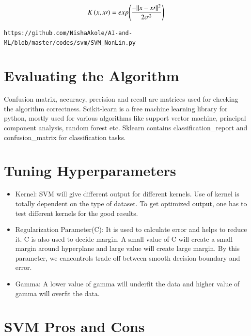 \documentclass[journal,12pt,twocolumn]{IEEEtran}
\def\SP#1{\textsuperscript{\textcolor{black}{#1}}}
\begin{document}
\begin{align}
K\brak{x,x\prime} = exp{\brak{\frac{-\norm{x-x\prime}\SP{2}}{2\sigma\SP{2}}}}
\end{align}

\begin{lstlisting}[mathescape=true]
https://github.com/NishaAkole/AI-and-ML/blob/master/codes/svm/SVM_NonLin.py
\end{lstlisting}

\section{Evaluating the Algorithm}
Confusion matrix, accuracy, precision and recall are matrices used for checking the algorithm correctness. Scikit-learn is a free machine learning library for python, mostly used for various algorithms like support vector machine, principal component analysis, random forest etc. Sklearn contains classification\_report and confusion\_matrix for classification tasks.

\section{Tuning Hyperparameters}
\begin{itemize}
\item Kernel: SVM will give different output for different kernels. Use of kernel is totally dependent on the type of dataset. To get optimized output, one has to test different kernels for the good results.\\
	
\item Regularization Parameter(C): It is used to calculate error and helps to reduce it. C is also used to decide margin. A small value of C will create a small margin around hyperplane and large value will create large margin. By this parameter, we cancontrols trade off between smooth decision boundary and error.\\

\item Gamma: A lower value of gamma will underfit the data and higher value of gamma will overfit the data.\\

\end{itemize}


\section{SVM Pros and Cons}
\end{document}
